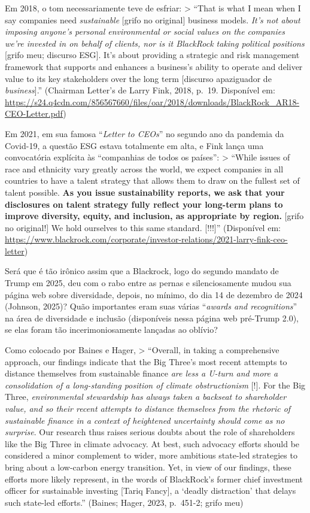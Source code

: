 Em 2018, o tom necessariamente teve de esfriar: \textgreater{} ``That is
what I mean when I say companies need \textit{sustainable} {[}grifo no
original{]} business models.
\textit{It’s not about imposing anyone’s personal environmental or social values on the companies we’re invested in on behalf of clients, nor is it BlackRock taking political positions}
{[}grifo meu; discurso ESG{]}. It's about providing a strategic and risk
management framework that supports and enhances a business's ability to
operate and deliver value to its key stakeholders over the long term
{[}discurso apaziguador de \textit{business}{]}.'' (Chairman Letter's de
Larry Fink, 2018, p.~19. Disponível em:
\url{https://s24.q4cdn.com/856567660/files/oar/2018/downloads/BlackRock_AR18-CEO-Letter.pdf})

Em 2021, em sua famosa ``\textit{Letter to CEOs}'' no segundo ano da
pandemia da Covid-19, a questão ESG estava totalmente em alta, e Fink
lança uma convocatória explícita às ``companhias de todos os países'':
\textgreater{} ``While issues of race and ethnicity vary greatly across
the world, we expect companies in all countries to have a talent
strategy that allows them to draw on the fullest set of talent possible.
\textbf{As you issue sustainability reports, we ask that your disclosures on talent strategy fully reflect your long-term plans to improve diversity, equity, and inclusion, as appropriate by region.}
{[}grifo no original!{]} We hold ourselves to this same standard.
{[}!!!{]}'' (Disponível em:
\url{https://www.blackrock.com/corporate/investor-relations/2021-larry-fink-ceo-letter})

Será que é tão irônico assim que a Blackrock, logo do segundo mandato de
Trump em 2025, deu com o rabo entre as pernas e silenciosamente mudou
sua página web sobre diversidade, depois, no mínimo, do dia 14 de
dezembro de 2024 (Johnson, 2025)? Quão importantes eram suas várias
``\textit{awards and recognitions}'' na área de diversidade e inclusão
(disponíveis nessa página web pré-Trump 2.0), se elas foram tão
incerimoniosamente lançadas ao oblívio?

Como colocado por Baines e Hager, \textgreater{} ``Overall, in taking a
comprehensive approach, our findings indicate that the Big Three's most
recent attempts to distance themselves from sustainable finance
\textit{are less a U-turn and more a consolidation of a long-standing position of climate obstructionism}
{[}!{]}. For the Big Three,
\textit{environmental stewardship has always taken a backseat to shareholder value, and so their recent attempts to distance themselves from the rhetoric of sustainable finance in a context of heightened uncertainty should come as no surprise}.
Our research thus raises serious doubts about the role of shareholders
like the Big Three in climate advocacy. At best, such advocacy efforts
should be considered a minor complement to wider, more ambitious
state-led strategies to bring about a low-carbon energy transition. Yet,
in view of our findings, these efforts more likely represent, in the
words of BlackRock's former chief investment officer for sustainable
investing {[}Tariq Fancy{]}, a `deadly distraction' that delays such
state-led efforts.'' (Baines; Hager, 2023, p.~451-2; grifo meu)

